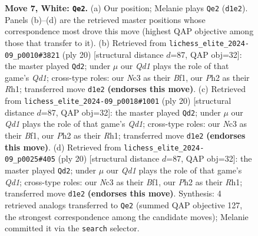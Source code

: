 \documentclass[11pt]{article}
\begin{document}
\begin{figure}[p]
\caption{\textbf{Move 7, White: \texttt{Qe2}.} (a) Our position; Melanie plays \texttt{Qe2} (\texttt{d1e2}). Panels (b)--(d) are the retrieved master positions whose correspondence most drove this move (highest QAP objective among those that transfer to it). (b) Retrieved from \texttt{lichess\_elite\_2024-09\_p0010\#3821} (ply 20) [structural distance $d$=87, QAP obj=32]: the master played \texttt{Qd2}; under $\mu$ our \emph{Qd1} plays the role of that game's \emph{Qd1}; cross-type roles: our \emph{N}c3 as their \emph{B}f1, our \emph{P}h2 as their \emph{R}h1; transferred move \texttt{d1e2} \textbf{(endorses this move)}. (c) Retrieved from \texttt{lichess\_elite\_2024-09\_p0018\#1001} (ply 20) [structural distance $d$=87, QAP obj=32]: the master played \texttt{Qd2}; under $\mu$ our \emph{Qd1} plays the role of that game's \emph{Qd1}; cross-type roles: our \emph{N}c3 as their \emph{B}f1, our \emph{P}h2 as their \emph{R}h1; transferred move \texttt{d1e2} \textbf{(endorses this move)}. (d) Retrieved from \texttt{lichess\_elite\_2024-09\_p0025\#405} (ply 20) [structural distance $d$=87, QAP obj=32]: the master played \texttt{Qd2}; under $\mu$ our \emph{Qd1} plays the role of that game's \emph{Qd1}; cross-type roles: our \emph{N}c3 as their \emph{B}f1, our \emph{P}h2 as their \emph{R}h1; transferred move \texttt{d1e2} \textbf{(endorses this move)}. Synthesis: 4 retrieved analogs transferred to \texttt{Qe2} (summed QAP objective 127, the strongest correspondence among the candidate moves); Melanie committed it via the \texttt{search} selector.}
\label{fig:thought-m12}
\end{figure}

\clearpage
\end{document}
